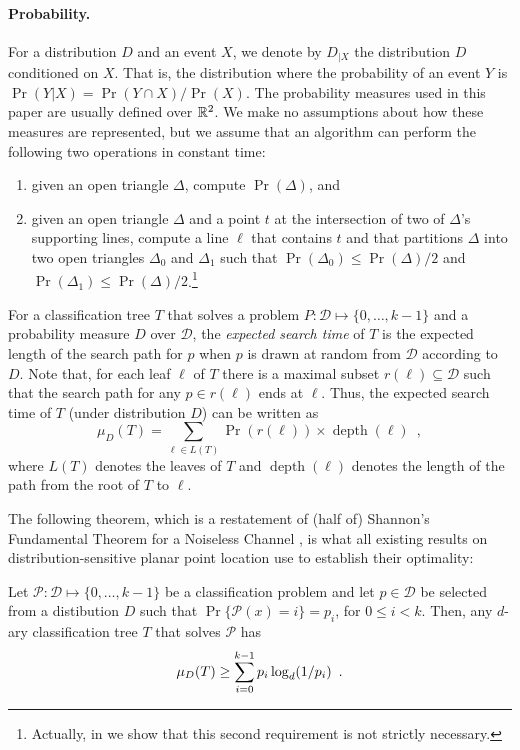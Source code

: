 \documentclass[charterfonts,lotsofwhite]{patmorin}
\DeclareMathOperator{\depth}{depth}
\begin{document}
\paragraph{Probability.}

For a distribution $D$ and an event $X$, we denote by $D_{|X}$ the
distribution $D$ conditioned on $X$.  That is, the distribution where
the probability of an event $Y$ is $\Pr(Y|X)=\Pr(Y\cap X)/\Pr(X)$.
The probability measures used in this paper are usually defined over
$\mathbb{R}^2$.  We make no assumptions about how these measures are
represented, but we assume that an algorithm can perform the following
two operations in constant time:
\begin{enumerate}
\item given an open triangle $\Delta$, compute $\Pr(\Delta)$, and
\item given an open triangle $\Delta$ and a point $t$ at the
intersection of two of $\Delta$'s supporting lines, compute a line $\ell$
that contains $t$ and that partitions $\Delta$ into two open triangles
$\Delta_0$ and $\Delta_1$ such that $\Pr(\Delta_0)\le\Pr(\Delta)/2$
and $\Pr(\Delta_1)\le\Pr(\Delta)/2$.\footnote{Actually, in
 we show that this second requirement is not
strictly necessary.}
\end{enumerate}

For a classification tree $T$ that solves a problem
$P:\mathcal{D}\mapsto\{0,\ldots,k-1\}$ and a probability measure $D$
over $\mathcal{D}$, the \emph{expected search time} of $T$ is the
expected length of the search path for $p$ when $p$ is drawn at random
from $\mathcal{D}$ according to $D$.  Note that, for each leaf $\ell$
of $T$ there is a maximal subset $r(\ell)\subseteq \mathcal{D}$ such
that the search path for any $p\in r(\ell)$ ends at $\ell$.  Thus, the
expected search time of $T$ (under distribution $D$) can be written as
\[
     \mu_D(T) = \sum_{\ell\in L(T)} \Pr(r(\ell))\times \depth(\ell)
	\enspace ,
\]
where $L(T)$ denotes the leaves of $T$ and $\depth(\ell)$ denotes the
length of the path from the root of $T$ to $\ell$.

The following theorem, which is a restatement of (half of) Shannon's
Fundamental Theorem for a Noiseless Channel \cite[Theorem 9]{s48}, is
what all existing results on distribution-sensitive planar point
location use to establish their optimality:

\setcounter{thm}{8}
\begin{thm}
Let $\mathcal{P}:\mathcal{D}\mapsto \{0,\ldots,k-1\}$ be a classification
problem and let $p\in \mathcal{D}$ be selected from a distibution $D$ such
that $\Pr\{\mathcal{P}(x)= i\}=p_i$, for $0\le i< k$.  Then, any
$d$-ary classification tree $T$ that solves $\mathcal{P}$ has
\begin{equation}
     \mu_D(T) \ge \sum_{i=0}^{k-1} p_i\log_d(1/p_i) \enspace .
	\eqlabel{shannon}
\end{equation}
\end{thm}
\setcounter{thm}{0}
\end{document}
